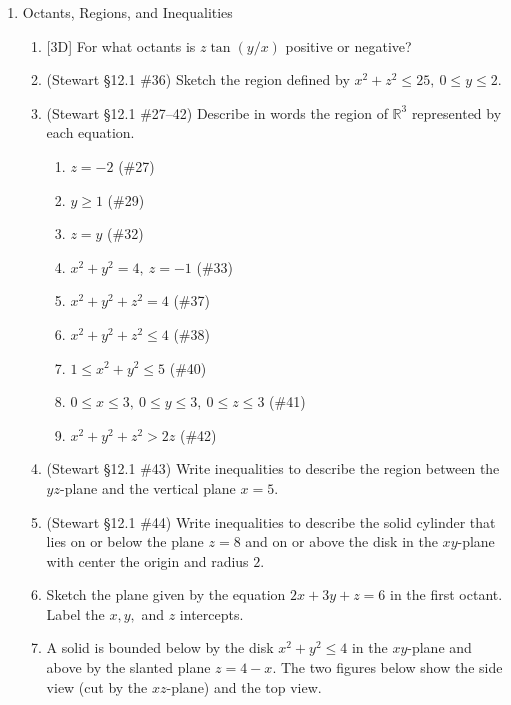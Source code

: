 \documentclass[12pt]{article}
\newcommand{\dimtag}[1]{{\footnotesize\textsc{[#1]}}\;}
\begin{document}
\begin{enumerate}
\item Octants, Regions, and Inequalities
    \begin{enumerate}
        \item \dimtag{3D} For what octants is $z\tan(y/x)$ positive or negative?
        \item (Stewart \S12.1 \#36) Sketch the region defined by $x^2 + z^2 \leq 25,\ 0 \leq y \leq 2$.
        \item (Stewart \S12.1 \#27--42) Describe in words the region of $\mathbb{R}^3$ represented by each equation.
        \begin{enumerate}
            \item $z = -2$ \quad (\#27)
            \item $y \geq 1$ \quad (\#29)
            \item $z = y$ \quad (\#32)
            \item $x^2 + y^2 = 4,\ z = -1$ \quad (\#33)
            \item $x^2 + y^2 + z^2 = 4$ \quad (\#37)
            \item $x^2 + y^2 + z^2 \leq 4$ \quad (\#38)
            \item $1 \leq x^2 + y^2 \leq 5$ \quad (\#40)
            \item $0 \leq x \leq 3,\ 0 \leq y \leq 3,\ 0 \leq z \leq 3$ \quad (\#41)
            \item $x^2 + y^2 + z^2 > 2z$ \quad (\#42)
        \end{enumerate}
        \item (Stewart \S12.1 \#43) Write inequalities to describe the region between the $yz$-plane and the vertical plane $x = 5$.
        \item (Stewart \S12.1 \#44) Write inequalities to describe the solid cylinder that lies on or below the plane $z=8$ and on or above the disk in the $xy$-plane with center the origin and radius $2$.
        \item Sketch the plane given by the equation $2x + 3y + z = 6$ in the first octant. Label the $x, y,$ and $z$ intercepts.
        \item A solid is bounded below by the disk $x^2+y^2\le 4$ in the $xy$-plane and above by the slanted plane $z = 4 - x$. The two figures below show the side view (cut by the $xz$-plane) and the top view.
        \begin{center}
\end{center}
\end{enumerate}
\end{enumerate}
\end{document}
